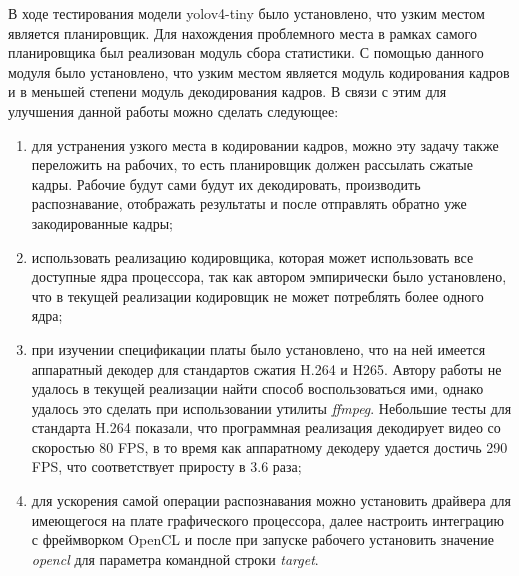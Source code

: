В ходе тестирования модели yolov4-tiny было установлено, что узким местом является планировщик. Для нахождения проблемного
места в рамках самого планировщика был реализован модуль сбора статистики. С помощью данного модуля было установлено, что
узким местом является модуль кодирования кадров и в меньшей степени модуль декодирования кадров. В связи с этим для
улучшения данной работы можно сделать следующее:

\begin{enumerate}
\item для устранения узкого места в кодировании кадров, можно эту задачу также переложить на рабочих, то есть планировщик
должен рассылать сжатые кадры. Рабочие будут сами будут их декодировать, производить распознавание, отображать результаты и
после отправлять обратно уже закодированные кадры;
\item использовать реализацию кодировщика, которая может использовать все доступные ядра процессора, так как автором 
эмпирически было установлено, что в текущей реализации кодировщик не может потреблять более одного ядра;
\item при изучении спецификации платы было установлено, что на ней имеется аппаратный декодер для стандартов сжатия
H.264 и H265. Автору работы не удалось в текущей реализации найти способ воспользоваться ими, однако удалось это сделать
при использовании утилиты \emph{ffmpeg}. Небольшие тесты для стандарта H.264 показали, что программная реализация декодирует 
видео со скоростью 80 FPS, в то время как аппаратному декодеру удается достичь 290 FPS, что соответствует приросту в 3.6 раза;
\item для ускорения самой операции распознавания можно установить драйвера для имеющегося на плате графического процессора, 
далее настроить интеграцию с фреймворком OpenCL и после при запуске рабочего установить значение \emph{opencl} для
параметра командной строки \emph{target}.
\end{enumerate}

\clearpage
